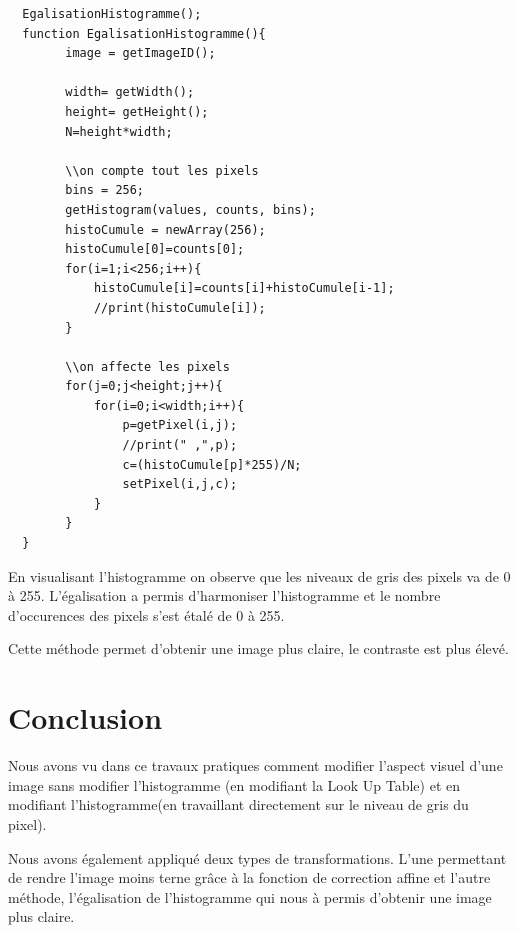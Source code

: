\documentclass[a4paper,12pt]{report}
\begin{document}
\begin{lstlisting}
  EgalisationHistogramme();
  function EgalisationHistogramme(){
		image = getImageID();
	
		width= getWidth();
		height= getHeight();
		N=height*width;
		
		\\on compte tout les pixels
		bins = 256;
		getHistogram(values, counts, bins);
		histoCumule = newArray(256);
		histoCumule[0]=counts[0];
		for(i=1;i<256;i++){
			histoCumule[i]=counts[i]+histoCumule[i-1];
			//print(histoCumule[i]);
		}
		
		\\on affecte les pixels
		for(j=0;j<height;j++){
			for(i=0;i<width;i++){
				p=getPixel(i,j);
				//print(" ,",p);
				c=(histoCumule[p]*255)/N;
				setPixel(i,j,c);
			}
		}
  }
\end{lstlisting}

En visualisant l'histogramme on observe que les niveaux de gris des pixels va de 0 à 255. L'égalisation a permis d'harmoniser l'histogramme et le nombre d'occurences des pixels s'est étalé de 0 à 255.

Cette méthode permet d'obtenir une image plus claire, le contraste est plus élevé.
	
\newpage
	
\section*{Conclusion}

Nous avons vu dans ce travaux pratiques comment modifier l’aspect visuel d’une image sans modifier l’histogramme (en modifiant la Look Up Table) et en modifiant l’histogramme(en travaillant directement sur le niveau de gris du pixel).

Nous avons également appliqué deux types de transformations. L'une permettant de rendre l'image moins terne grâce à la fonction de correction affine et l'autre méthode, l'égalisation de l'histogramme qui nous à permis d'obtenir une image plus claire.
\end{document}
